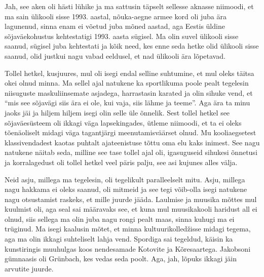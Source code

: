 
Jah, see aken oli hästi lühike ja ma sattusin täpselt sellesse aknasse 
niimoodi, et ma sain ülikooli sisse 1993. aastal, nõuka-aegne armee kord oli juba ära 
lagunenud, sinna enam ei võetud juba mõned aastad, aga Eestis üldine 
sõjaväekohustus kehtestatigi  1993. aasta sügisel. Ma olin suvel ülikooli sisse 
saanud, sügisel juba kehtestati ja kõik need, kes enne seda hetke olid ülikooli 
sisse saanud, olid justkui nagu vabad eeldusel, et nad ülikooli ära lõpetavad. 


Tollel hetkel, kusjuures, mul oli isegi endal selline suhtumine, et mul 
oleks täitsa okei olnud minna. Ma sellel ajal natukene ka sportlikuma poole 
pealt tegelesin niisuguste maskuliinsemate asjadega, harrastasin karated ja 
olin sihuke  vend, et \enquote{mis see sõjavägi siis ära ei ole, kui vaja, siis 
lähme ja teeme}. Aga ära ta minu jaoks jäi ja hiljem hiljem isegi olin selle üle õnnelik. 
Sest tollel  hetkel see sõjaväesüsteem oli ikkagi 
väga lapsekingades, ütleme niimoodi, et ta ei oleks tõenäoliselt  midagi 
väga tagantjärgi meenutamisväärset olnud. Mu kooliaegsetest 
klassivendadest kaotas puhtalt  ajateenistuse tõttu oma elu kaks inimest. See 
nagu natukene näitab seda,  milline see tase tollel ajal oli, igasuguseid 
sihukesi õnnetusi ja  korralagedust oli tollel hetkel veel päris palju, see asi 
kujunes alles välja. 


Neid asju, millega ma tegelesin, oli tegelikult paralleelselt mitu. Asju, 
millega nagu hakkama ei oleks saanud, oli mitmeid ja see tegi 
võib-olla isegi natukene nagu otsustamist raskeks, et mille juurde jääda. 
Laulmise ja muusika mõttes mul kuulmist oli, aga seal sai määravaks see, et 
kuna mul muusikakooli haridust all ei olnud, siis  sellega ma olin juba nagu 
rongi pealt maas, sinna kuhugi ma ei  trüginud. Ma isegi kaalusin mõtet, et 
minna kultuurikolledžisse midagi tegema, aga ma olin ikkagi suhteliselt lahja 
vend. Spordiga sai tegeldud, käisin ka kunstiringis muuhulgas koos  nendesamade 
Kotovite ja Kõresaartega. 
 Jakobsoni gümnaasis oli Grünbach, kes vedas seda poolt. Aga, jah, 
lõpuks ikkagi jäin arvutite juurde. 

